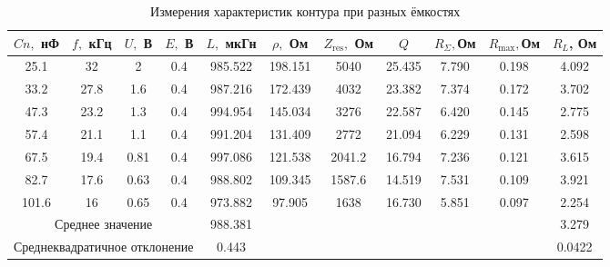 \documentclass[a4paper]{article}
\begin{document}
\begin{table}[h]
    \centering
    \begin{center}
        \caption{Измерения характеристик контура при разных ёмкостях}
    \end{center}
    \vspace{0.1cm}
    \label{tab:my_label}
    \begin{tabular}{ |c|c|c|c|c|c|c|c|c|c|c|}
        \hline
        $Cn,$ нФ                                            & $f,$ кГц & $U,$ В                 & $E,$ В & $L,$ мкГн & $\rho,$ Ом & $Z_\text{res},$ Ом & $Q$    & $R_{\Sigma},$Ом & $R_\text{max}, $Ом & $R_L$, Ом \\ \hline
        25.1                                                & 32       & 2                      & 0.4    & 985.522   & 198.151    & 5040               & 25.435 & 7.790           & 0.198              & 4.092     \\\hline
        33.2                                                & 27.8     & 1.6                    & 0.4    & 987.216   & 172.439    & 4032               & 23.382 & 7.374           & 0.172              & 3.702     \\\hline
        47.3                                                & 23.2     & 1.3                    & 0.4    & 994.954   & 145.034    & 3276               & 22.587 & 6.420           & 0.145              & 2.775     \\\hline
        57.4                                                & 21.1     & 1.1                    & 0.4    & 991.204   & 131.409    & 2772               & 21.094 & 6.229           & 0.131              & 2.598     \\\hline
        67.5                                                & 19.4     & 0.81                   & 0.4    & 997.086   & 121.538    & 2041.2             & 16.794 & 7.236           & 0.121              & 3.615     \\\hline
        82.7                                                & 17.6     & 0.63                   & 0.4    & 988.802   & 109.345    & 1587.6             & 14.519 & 7.531           & 0.109              & 3.921     \\\hline
        101.6                                               & 16       & 0.65                   & 0.4    & 973.882   & 97.905     & 1638               & 16.730 & 5.851           & 0.097              & 2.254     \\\hline
        \multicolumn{4}{|c|}{Среднее значение}              & 988.381  & \multicolumn{5}{|c|}{} & 3.279                                                                                                            \\ \hline
        \multicolumn{4}{|c|}{Среднеквадратичное отклонение} & 0.443    & \multicolumn{5}{|c|}{} & 0.0422                                                                                                           \\ \hline

    \end{tabular}
\end{table}
\end{document}
